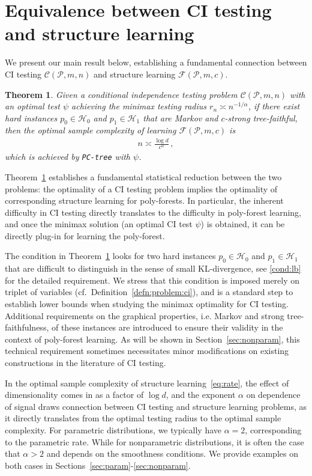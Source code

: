 \documentclass{article}
\newtheorem{theorem}{Theorem}[section]
\theoremstyle{definition}
\theoremstyle{definition}
\theoremstyle{definition}
\theoremstyle{definition}
\theoremstyle{definition}
\theoremstyle{definition}
\theoremstyle{remark}
\theoremstyle{remark}
\newcommand{\dpdm}{m}
\newcommand{\dd}{d}
\newcommand{\ciclass}{\mathcal{C}}
\newcommand{\pfclass}{\mathcal{F}}
\newcommand{\hone}{\mathcal{H}_1}
\newcommand{\hzero}{\mathcal{H}_0}
\begin{document}
\section{Equivalence between CI testing and structure learning}\label{sec:main}
We present our main result below, establishing a fundamental connection between CI testing $\ciclass(\mathcal{P},\dpdm,n)$ and structure learning $\pfclass(\mathcal{P},\dpdm,c)$.
\begin{theorem}\label{thm:main}
    Given a conditional independence testing problem $\ciclass(\mathcal{P},\dpdm,n)$ with an optimal test $\psi$ achieving the minimax testing radius $r_n\asymp n^{-1/\alpha}$, if there exist hard instances $p_0\in\hzero$ and $p_1\in \hone$ that are Markov and $c$-strong tree-faithful, then the optimal sample complexity of learning $\pfclass(\mathcal{P},\dpdm,c)$ is
    \begin{align}\label{eq:rate}
        n \asymp \frac{\log\dd}{c^\alpha} \,,
    \end{align}
    which is achieved by \texttt{PC-tree} with $\psi$.
\end{theorem}
Theorem~\ref{thm:main} establishes a fundamental statistical reduction between the two problems: the optimality of a CI testing problem implies the optimality of corresponding structure learning for poly-forests. 
In particular, the inherent difficulty in CI testing directly translates to the difficulty in poly-forest learning, and once the minimax solution (an optimal CI test $\psi$) is obtained, it can be directly plug-in for learning the poly-forest.


The condition in Theorem~\ref{thm:main} looks for two hard instances $p_0\in\hzero$ and $p_1\in\hone$ that are difficult to distinguish in the sense of small KL-divergence, see \ref{cond:lb} for the detailed requirement. We stress that this condition is imposed merely on triplet of variables (cf.~Definition~\ref{defn:problem:ci}), and is a standard step to establish lower bounds when studying the minimax optimality for CI testing.
Additional requirements on the graphical properties, i.e. Markov and strong tree-faithfulness, of these instances are introduced to ensure their validity in the context of poly-forest learning. 
As will be shown in Section~\ref{sec:nonparam}, this technical requirement sometimes necessitates minor modifications on existing constructions in the literature of CI testing.




In the optimal sample complexity of structure learning~\eqref{eq:rate}, the effect of dimensionality comes in as a factor of $\log\dd$,
and the exponent $\alpha$ on dependence of signal draws connection between CI testing and structure learning problems, as it directly translates from the optimal testing radius to the optimal sample complexity. 
For parametric distributions, we typically have $\alpha=2$, corresponding to the parametric rate. While for nonparametric distributions, it is often the case that $\alpha>2$ and depends on the smoothness conditions.
We provide examples on both cases in Sections~\ref{sec:param}-\ref{sec:nonparam}.
\end{document}
